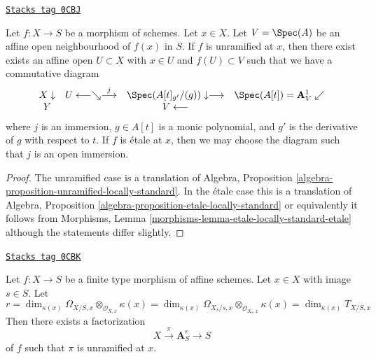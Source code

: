 \begin{lemma}
\label{varieties-lemma-geometric-structure-unramified}
\href{https://stacks.math.columbia.edu/tag/0CBJ}{\texttt{Stacks tag 0CBJ}}

Let $f : X \to S$ be a morphism of schemes. Let $x \in X$.
Let $V = \Spec(A)$ be an affine open neighbourhood of $f(x)$ in $S$.
If $f$ is unramified at $x$, then there exist exists an affine open
$U \subset X$ with $x \in U$ and $f(U) \subset V$
such that we have a commutative diagram
$$
\begin{array}{cccc}X \downarrow & U \longleftarrow\searrow\overset{j}{\longrightarrow} & \Spec(A[t]_{g'}/(g)) \downarrow\longrightarrow & \Spec(A[t]) = \mathbf{A}^1_V \swarrow \\ Y &  & V \longleftarrow & \end{array}
$$
where $j$ is an immersion, $g \in A[t]$ is a monic polynomial, and
$g'$ is the derivative of $g$ with respect to $t$. If $f$ is \'etale
at $x$, then we may choose the diagram such that $j$ is an open immersion.
\end{lemma}

\begin{proof}
The unramified case is a translation of
Algebra, Proposition \ref{algebra-proposition-unramified-locally-standard}.
In the \'etale case this is a translation of
Algebra, Proposition \ref{algebra-proposition-etale-locally-standard}
or equivalently it follows from
Morphisms, Lemma \ref{morphisms-lemma-etale-locally-standard-etale}
although the statements differ slightly.
\end{proof}

\begin{lemma}
\label{varieties-lemma-unramfied-over-affine}
\href{https://stacks.math.columbia.edu/tag/0CBK}{\texttt{Stacks tag 0CBK}}

Let $f : X \to S$ be a finite type morphism of affine schemes.
Let $x \in X$ with image $s \in S$. Let
$$
r =
\dim_{\kappa(x)} \Omega_{X/S, x} \otimes_{\mathcal{O}_{X, x}} \kappa(x) =
\dim_{\kappa(x)} \Omega_{X_s/s, x} \otimes_{\mathcal{O}_{X_s, x}} \kappa(x) =
\dim_{\kappa(x)} T_{X/S, x}
$$
Then there exists a factorization
$$
X \xrightarrow{\pi} \mathbf{A}^r_S \to S
$$
of $f$ such that $\pi$ is unramified at $x$.
\end{lemma}

